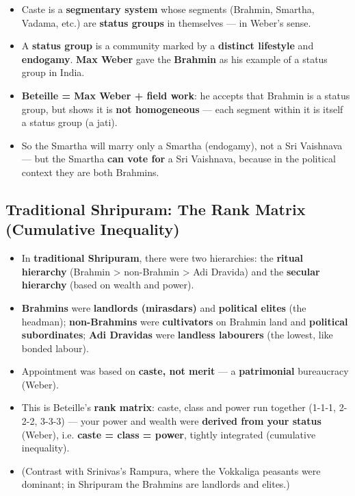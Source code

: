 \begin{KeyConcept}
\begin{itemize}
\item Caste is a \textbf{segmentary system} whose segments (Brahmin, Smartha, Vadama, etc.) are \textbf{status groups} in themselves --- in Weber's sense.
\item A \textbf{status group} is a community marked by a \textbf{distinct lifestyle} and \textbf{endogamy}. \textbf{Max Weber} gave the \textbf{Brahmin} as his example of a status group in India.
\item \textbf{Beteille = Max Weber + field work}: he accepts that Brahmin is a status group, but shows it is \textbf{not homogeneous} --- each segment within it is itself a status group (a jati).
\item So the Smartha will marry only a Smartha (endogamy), not a Sri Vaishnava --- but the Smartha \textbf{can vote for} a Sri Vaishnava, because in the political context they are both Brahmins.
\end{itemize}
\end{KeyConcept}

\subsection{Traditional Shripuram: The Rank Matrix (Cumulative Inequality)}

\begin{KeyConcept}
\begin{itemize}
\item In \textbf{traditional Shripuram}, there were two hierarchies: the \textbf{ritual hierarchy} (Brahmin > non-Brahmin > Adi Dravida) and the \textbf{secular hierarchy} (based on wealth and power).
\item \textbf{Brahmins} were \textbf{landlords (mirasdars)} and \textbf{political elites} (the headman); \textbf{non-Brahmins} were \textbf{cultivators} on Brahmin land and \textbf{political subordinates}; \textbf{Adi Dravidas} were \textbf{landless labourers} (the lowest, like bonded labour).
\item Appointment was based on \textbf{caste, not merit} --- a \textbf{patrimonial} bureaucracy (Weber).
\item This is Beteille's \textbf{rank matrix}: caste, class and power run together (1-1-1, 2-2-2, 3-3-3) --- your power and wealth were \textbf{derived from your status} (Weber), i.e. \textbf{caste = class = power}, tightly integrated (cumulative inequality).
\item (Contrast with Srinivas's Rampura, where the Vokkaliga peasants were dominant; in Shripuram the Brahmins are landlords and elites.)
\end{itemize}
\end{KeyConcept}

